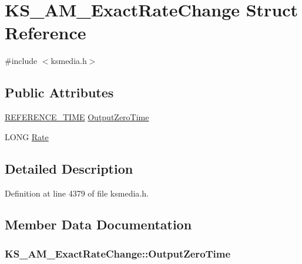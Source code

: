 \hypertarget{struct_k_s___a_m___exact_rate_change}{}\section{K\+S\+\_\+\+A\+M\+\_\+\+Exact\+Rate\+Change Struct Reference}
\label{struct_k_s___a_m___exact_rate_change}


{\ttfamily \#include $<$ksmedia.\+h$>$}

\subsection*{Public Attributes}
\begin{DoxyCompactItemize}
\item 
\hyperlink{ksmedia_8h_a83927f70641d4e9a344563bd9ddb15ae}{R\+E\+F\+E\+R\+E\+N\+C\+E\+\_\+\+T\+I\+ME} \hyperlink{struct_k_s___a_m___exact_rate_change_a6aa1c0225426401c7f5763813319e53f}{Output\+Zero\+Time}
\item 
L\+O\+NG \hyperlink{struct_k_s___a_m___exact_rate_change_a01206cd8be9be90b1ad030c8b462e45a}{Rate}
\end{DoxyCompactItemize}


\subsection{Detailed Description}


Definition at line 4379 of file ksmedia.\+h.



\subsection{Member Data Documentation}
\subsubsection[{\texorpdfstring{Output\+Zero\+Time}{OutputZeroTime}}]{ K\+S\+\_\+\+A\+M\+\_\+\+Exact\+Rate\+Change\+::\+Output\+Zero\+Time}\hypertarget{struct_k_s___a_m___exact_rate_change_a6aa1c0225426401c7f5763813319e53f}{}\label{struct_k_s___a_m___exact_rate_change_a6aa1c0225426401c7f5763813319e53f}


